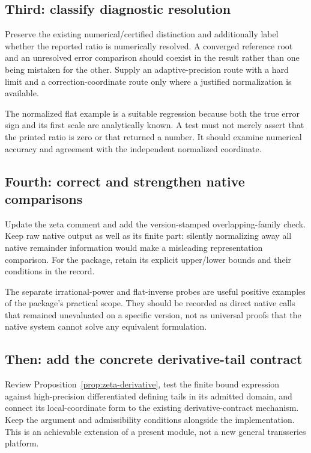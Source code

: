 \documentclass[11pt,letterpaper]{article}
\newcommand{\code}[1]{\texttt{\detokenize{#1}}}
\begin{document}
\subsection{Third: classify diagnostic resolution}
Preserve the existing numerical/certified distinction and additionally label
whether the reported ratio is numerically resolved. A converged reference root
and an unresolved error comparison should coexist in the result rather than
one being mistaken for the other. Supply an adaptive-precision route with a
hard limit and a correction-coordinate route only where a justified
normalization is available.

The normalized flat example is a suitable regression because both the true
error sign and its first scale are analytically known. A test must not merely
assert that the printed ratio is zero or that \code{FindRoot} returned a
number. It should examine numerical accuracy and agreement with the
independent normalized coordinate.

\subsection{Fourth: correct and strengthen native comparisons}
Update the zeta comment and add the version-stamped overlapping-family check.
Keep raw native \code{Series} output as well as its finite part: silently
normalizing away all native remainder information would make a misleading
representation comparison. For the package, retain its explicit upper/lower
bounds and their conditions in the record.

The separate irrational-power and flat-inverse probes are useful positive
examples of the package's practical scope. They should be recorded as direct
native calls that remained unevaluated on a specific version, not as universal
proofs that the native system cannot solve any equivalent formulation.

\subsection{Then: add the concrete derivative-tail contract}
Review Proposition~\ref{prop:zeta-derivative}, test the finite bound expression
against high-precision differentiated defining tails in its admitted domain,
and connect its local-coordinate form to the existing derivative-contract
mechanism. Keep the argument and admissibility conditions alongside the
implementation. This is an achievable extension of a present module, not a
new general transseries platform.
\end{document}
